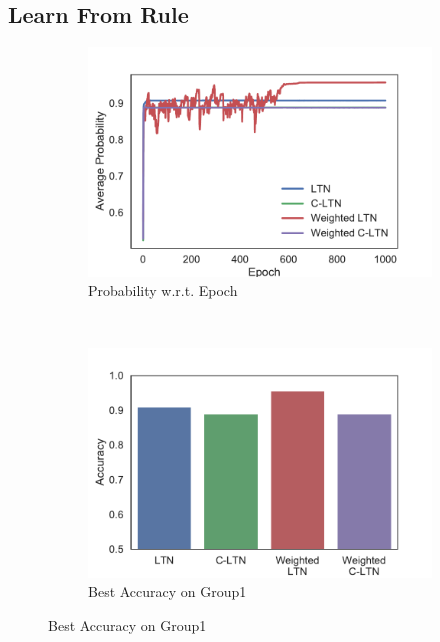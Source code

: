 
\subsection{Learn From Rule}

\begin{figure}[!]
    \centering
    \begin{subfigure}[]{0.33\textwidth}
        \includegraphics[width=\textwidth]{img/curve2.pdf}
        \caption{Probability w.r.t. Epoch}
        \label{fig:learning-prob-epoch}
    \end{subfigure}~~~~
    \begin{subfigure}[]{0.33\textwidth}
        \includegraphics[width=\textwidth]{img/bar3.pdf}
        \caption{Best Accuracy on Group1}

\end{subfigure}
\end{figure}
